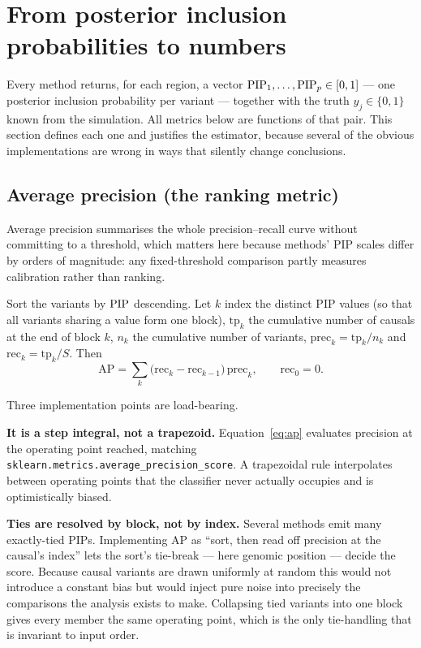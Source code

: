 \section{From posterior inclusion probabilities to numbers}\label{sec:methods}

Every method returns, for each region, a vector
$\mathrm{PIP}_1,\dots,\mathrm{PIP}_p\in[0,1]$ --- one posterior inclusion probability per
variant --- together with the truth $y_j\in\{0,1\}$ known from the simulation.
All metrics below are functions of that pair. This section defines each one and
justifies the estimator, because several of the obvious implementations are
wrong in ways that silently change conclusions.

\subsection{Average precision (the ranking metric)}\label{sec:ap}

Average precision summarises the whole precision--recall curve without
committing to a threshold, which matters here because methods' PIP scales
differ by orders of magnitude: any fixed-threshold comparison partly measures
calibration rather than ranking.

Sort the variants by $\mathrm{PIP}$ descending. Let $k$ index the distinct PIP values
(so that all variants sharing a value form one block), $\mathrm{tp}_k$ the
cumulative number of causals at the end of block $k$, $n_k$ the cumulative
number of variants, $\mathrm{prec}_k=\mathrm{tp}_k/n_k$ and
$\mathrm{rec}_k=\mathrm{tp}_k/S$. Then
\begin{equation}
\mathrm{AP}=\sum_k\bigl(\mathrm{rec}_k-\mathrm{rec}_{k-1}\bigr)\,\mathrm{prec}_k ,
\qquad \mathrm{rec}_0=0 .
\label{eq:ap}
\end{equation}

Three implementation points are load-bearing.

\textbf{It is a step integral, not a trapezoid.} Equation~\eqref{eq:ap}
evaluates precision at the operating point reached, matching
\texttt{sklearn.metrics.average\_precision\_score}. A trapezoidal rule
interpolates between operating points that the classifier never actually
occupies and is optimistically biased.

\textbf{Ties are resolved by block, not by index.} Several methods emit many
exactly-tied PIPs. Implementing AP as ``sort, then read off precision at the
causal's index'' lets the sort's tie-break --- here genomic position --- decide
the score. Because causal variants are drawn uniformly at random this would not
introduce a constant bias but would inject pure noise into precisely the
comparisons the analysis exists to make. Collapsing tied variants into one
block gives every member the same operating point, which is the only
tie-handling that is invariant to input order.

